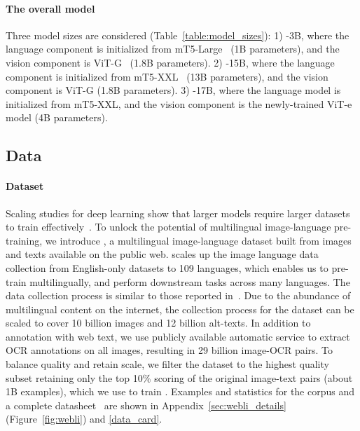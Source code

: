\documentclass{article}
\begin{document}
\paragraph{The overall model}
Three model sizes are considered (Table~\ref{table:model_sizes}): 
1) \NAME-3B, where the language component is initialized from mT5-Large~\citep{xue-2021-mt5} (1B parameters), and the vision component is ViT-G~\citep{zhai-21-scalingvit} (1.8B parameters).
2) \NAME-15B, where the language component is initialized from mT5-XXL~\citep{xue-2021-mt5} (13B parameters), and the vision component is ViT-G (1.8B parameters).
3) \NAME-17B, where the language model is initialized from mT5-XXL, and the vision component is the newly-trained ViT-e model (4B parameters).


\subsection{Data}
\label{sec:data}

\paragraph{\PTDATA Dataset}

Scaling studies for deep learning show that larger models require larger datasets to train effectively~\citep{hoffmann2022chinchilla,scaling_nlp,zhai-21-scalingvit}.
To unlock the potential of multilingual image-language pre-training, we introduce \PTDATA, a multilingual image-language dataset built from images and texts available on the public web.
%
\PTDATA scales up the image language data collection from English-only datasets to 109 languages, which enables us to pre-train \NAME multilingually, and perform downstream tasks across many languages.
The data collection process is similar to those reported in~\citep{align,lit}.
Due to the abundance of multilingual content on the internet, the collection process for the \PTDATA dataset can be scaled to cover 10 billion images and 12 billion alt-texts.
In addition to annotation with web text, we use publicly available automatic service to extract OCR annotations on all images,
resulting in 29 billion image-OCR pairs.
To balance quality and retain scale, we filter the dataset to the highest quality subset retaining only the top 10\% scoring of the original \PTDATA image-text pairs (about 1B examples), which we use to train \NAME. %
Examples and statistics for the \PTDATA corpus and a complete datasheet~\citep{datacard} are shown in Appendix~\ref{sec:webli_details} (Figure~\ref{fig:webli}) and \ref{data_card}.
\end{document}
